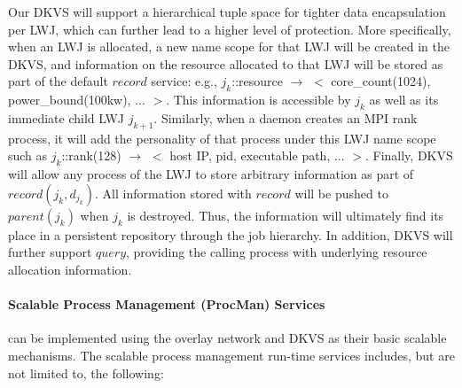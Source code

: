 Our DKVS will support a hierarchical tuple space for tighter
data encapsulation per LWJ, which can further lead to a higher level of 
protection.
More specifically, when an LWJ is
allocated, a new name scope for that LWJ will be
created in the DKVS, and information on the resource allocated
to that LWJ will be stored as part of the default $record$ service: e.g.,
$j_k$::resource $\rightarrow$ $<$ core\_count(1024), power\_bound(100kw), ... $>$.
This information is accessible by $j_k$ as well as
its immediate child LWJ $j_{k+1}$.
Similarly, when a daemon creates an MPI rank process, it will add the
personality of that process under this LWJ name scope
such as $j_k$::rank(128) $\rightarrow$ $<$ host IP, pid, executable path, ... $>$.
Finally, DKVS will allow any process of the LWJ to store arbitrary information
as part of $record(j_k, d_{j_k})$. All information stored
with $record$ will be pushed to $parent(j_k)$ when $j_k$
is destroyed. Thus, the information will ultimately find its place
in a persistent repository through the job hierarchy. In addition,
DKVS will further support $query$, providing the calling process
with underlying resource allocation information.

\paragraph{Scalable Process Management (ProcMan) Services}
\label{sect:procman}
can be implemented using the overlay network and DKVS as their 
basic scalable mechanisms. The scalable process management 
run-time services includes, but are not limited to, the following:

